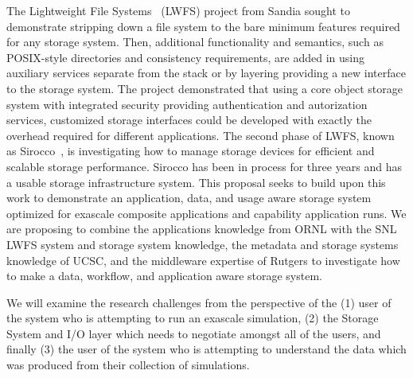 The Lightweight File Systems~\cite{lwfs} (LWFS) project from Sandia sought to
demonstrate stripping down a file system to the bare minimum features required
for any storage system. Then, additional functionality and semantics, such as
POSIX-style directories and consistency requirements, are added in using
auxiliary services separate from the stack or by layering providing a new
interface to the storage system. The project demonstrated that using a core
object storage system with integrated security providing authentication and
autorization services, customized storage interfaces could be developed with
exactly the overhead required for different applications. The second phase of
LWFS, known as Sirocco~\cite{sirocco}, is investigating how to manage storage
devices for efficient and scalable storage performance.  Sirocco has been in
process for three years and has a usable storage infrastructure system. This
proposal seeks to build upon this work to demonstrate an application, data, and
usage aware storage system optimized for exascale composite applications and
capability application runs. We are proposing to combine the applications
knowledge from ORNL with the SNL LWFS system and storage system knowledge, the
metadata and storage systems knowledge of UCSC, and the middleware expertise of
Rutgers to investigate how to make a data, workflow, and application aware
storage system.

We will examine the research challenges from the perspective of the
%
(1) user of the system who is attempting to run an exascale simulation,
%
(2) the Storage System and I/O layer which needs to negotiate amongst all of
the users, and finally
%
(3) the user of the system who is attempting to understand the data which
was produced from their collection of simulations.

